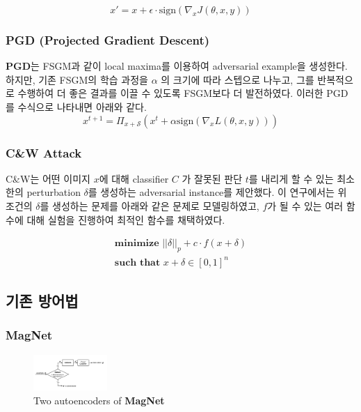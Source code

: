 \documentclass{article}
\begin{document}
\[
x' = x + \epsilon \cdot \mathrm{sign}(\nabla_x J(\theta, x, y))
\] 


\subsubsection{PGD (Projected Gradient Descent)}

\textbf{PGD}는 FSGM과 같이 local maxima를 이용하여 adversarial example을 생성한다. 하지만, 기존 FSGM의 학습 과정을 $\alpha$ 의 크기에 따라 스텝으로 나누고, 그를 반복적으로 수행하여 더 좋은 결과를 이끌 수 있도록 FSGM보다 더 발전하였다. 이러한 PGD를 수식으로 나타내면 아래와 같다. \cite{madry2017towards}
\[
x^{t+1} = \Pi_{x + \mathcal{S}} (x^t + \alpha\mathrm{sign}(\nabla_x L(\theta, x, y)))
\]

\subsubsection{C\&W Attack}
C\&W는 어떤 이미지 $x$에 대해 classifier $C$ 가 잘못된 판단 $t$를 내리게 할 수 있는 최소한의 perturbation $\delta$를 생성하는 adversarial instance를 제안했다.\cite{carlini2017towards} 이 연구에서는 위 조건의 $\delta$를 생성하는 문제를 아래와 같은 문제로 모델링하였고, $f$가 될 수 있는 여러 함수에 대해 실험을 진행하여 최적인 함수를 채택하였다.

\[
\begin{array}{c}
    \textbf{minimize } ||\delta||_p + c \cdot f(x + \delta) \\
    \textbf{such that } x + \delta \in [0, 1]^n
\end{array}
\]

\subsection{기존 방어법}

\subsubsection{MagNet}

\begin{figure}
    \centering
    \includegraphics[width=0.25\textwidth]{images/magnet-diagram.png}
    \caption{Two autoencoders of \textbf{MagNet} \cite{carlini2017magnet}}
\end{figure}
\end{document}
